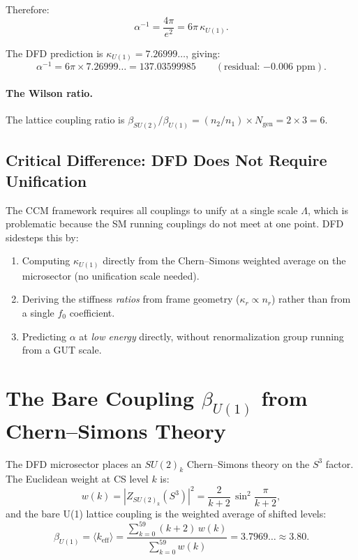 \documentclass[12pt,a4paper]{article}
\begin{document}
Therefore:
\begin{equation}
\boxed{\alpha^{-1} = \frac{4\pi}{e^2} = 6\pi\,\kappa_{U(1)}.}
\end{equation}

The DFD prediction is $\kappa_{U(1)} = 7.26999\ldots$, giving:
\begin{equation}
\alpha^{-1} = 6\pi \times 7.26999\ldots = 137.03599985
\qquad (\text{residual: } {-0.006}\text{ ppm}).
\end{equation}

\paragraph{The Wilson ratio.}
The lattice coupling ratio is
$\beta_{SU(2)}/\beta_{U(1)} = (n_2/n_1) \times N_{\mathrm{gen}} = 2 \times 3 = 6$.

\subsection{Critical Difference: DFD Does Not Require Unification}

The CCM framework requires all couplings to unify at a single scale
$\Lambda$, which is problematic because the SM running couplings do not
meet at one point.  DFD sidesteps this by:
\begin{enumerate}
\item Computing $\kappa_{U(1)}$ directly from the Chern--Simons weighted
  average on the microsector (no unification scale needed).
\item Deriving the stiffness \emph{ratios} from frame geometry
  ($\kappa_r \propto n_r$) rather than from a single $f_0$ coefficient.
\item Predicting $\alpha$ at \emph{low energy} directly, without
  renormalization group running from a GUT scale.
\end{enumerate}

\section{The Bare Coupling $\beta_{U(1)}$ from Chern--Simons Theory}
\label{sec:cs}

The DFD microsector places an $SU(2)_k$ Chern--Simons theory on the $S^3$
factor.  The Euclidean weight at CS level $k$ is:
\begin{equation}
w(k) = |Z_{SU(2)_k}(S^3)|^2 = \frac{2}{k+2}\,\sin^2\!\frac{\pi}{k+2},
\end{equation}
and the bare U(1) lattice coupling is the weighted average of shifted levels:
\begin{equation}
\beta_{U(1)} = \langle k_{\mathrm{eff}} \rangle
= \frac{\sum_{k=0}^{59}(k+2)\,w(k)}{\sum_{k=0}^{59}w(k)}
= 3.7969\ldots \approx 3.80.
\end{equation}
\end{document}
